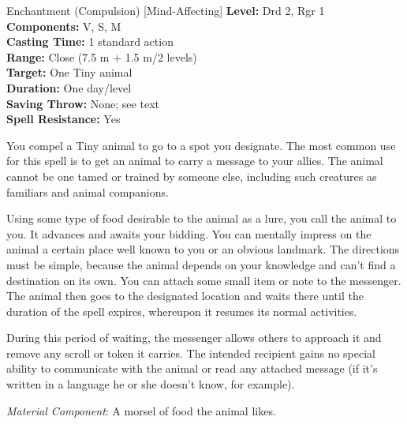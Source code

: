 {Enchantment (Compulsion) [Mind-Affecting]}
{
	\textbf{Level:}
	Drd 2, Rgr 1\\
	\textbf{Components:}
	V, S, M\\
	\textbf{Casting Time:}
	1 standard action\\
	\textbf{Range:}
	Close (7.5 m + 1.5 m/2 levels)\\
	\textbf{Target:}
	One Tiny animal\\
	\textbf{Duration:}
	One day/level\\
	\textbf{Saving Throw:}
	None; see text\\
	\textbf{Spell Resistance:}
	Yes\\
}
{
	You compel a Tiny animal to go to a spot you designate. The most common use for this spell is to get an animal to carry a message to your allies. The animal cannot be one tamed or trained by someone else, including such creatures as familiars and animal companions.

	Using some type of food desirable to the animal as a lure, you call the animal to you. It advances and awaits your bidding. You can mentally impress on the animal a certain place well known to you or an obvious landmark. The directions must be simple, because the animal depends on your knowledge and can't find a destination on its own. You can attach some small item or note to the messenger. The animal then goes to the designated location and waits there until the duration of the spell expires, whereupon it resumes its normal activities.

	During this period of waiting, the messenger allows others to approach it and remove any scroll or token it carries. The intended recipient gains no special ability to communicate with the animal or read any attached message (if it's written in a language he or she doesn't know, for example).

	\textit{Material Component}:
	A morsel of food the animal likes.

}
